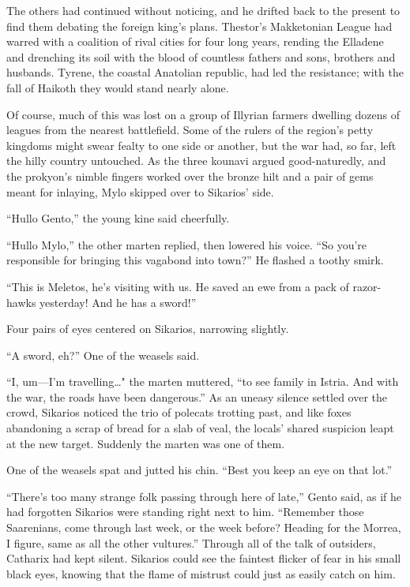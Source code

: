 The others had continued without noticing, and he drifted back to the present to find them debating the foreign king's plans. Thestor's Makketonian League had warred with a coalition of rival cities for four long years, rending the Elladene and drenching its soil with the blood of countless fathers and sons, brothers and husbands. Tyrene, the coastal Anatolian republic, had led the resistance; with the fall of Haikoth they would stand nearly alone.

Of course, much of this was lost on a group of Illyrian farmers dwelling dozens of leagues from the nearest battlefield. Some of the rulers of the region's petty kingdoms might swear fealty to one side or another, but the war had, so far, left the hilly country untouched. As the three kounavi argued good-naturedly, and the prokyon's nimble fingers worked over the bronze hilt and a pair of gems meant for inlaying, Mylo skipped over to Sikarios' side.

``Hullo Gento,'' the young kine said cheerfully.

``Hullo Mylo,'' the other marten replied, then lowered his voice. ``So you're responsible for bringing this vagabond into town?'' He flashed a toothy smirk.

``This is Meletos, he's visiting with us. He saved an ewe from a pack of razor-hawks yesterday! And he has a sword!''

Four pairs of eyes centered on Sikarios, narrowing slightly.

``A sword, eh?'' One of the weasels said.

``I, um---I'm travelling\ldots" the marten muttered, ``to see family in Istria. And with the war, the roads have been dangerous.'' As an uneasy silence settled over the crowd, Sikarios noticed the trio of polecats trotting past, and like foxes abandoning a scrap of bread for a slab of veal, the locals' shared suspicion leapt at the new target. Suddenly the marten was one of them.

One of the weasels spat and jutted his chin. ``Best you keep an eye on that lot.''

``There's too many strange folk passing through here of late,'' Gento said, as if he had forgotten Sikarios were standing right next to him. ``Remember those Saarenians, come through last week, or the week before? Heading for the Morrea, I figure, same as all the other vultures.'' Through all of the talk of outsiders, Catharix had kept silent. Sikarios could see the faintest flicker of fear in his small black eyes, knowing that the flame of mistrust could just as easily catch on him.

